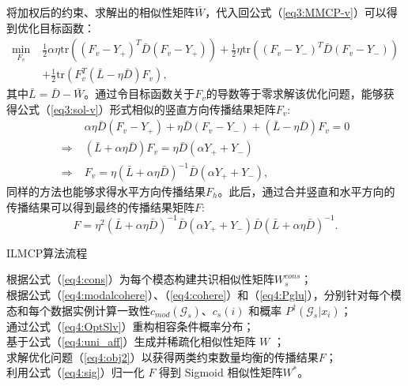 将加权后的约束、求解出的相似性矩阵$\bar{W}$，代入回公式（\ref{eq3:MMCP-v}）可以得到优化目标函数：
\begin{equation}
\begin{split}
\mathop{\mathrm{min}}_{{F}_v}\;&\frac{1}{2}\alpha\eta \mathrm{tr}(({F}_v-{Y}_+)^T{\bar{D}}({F}_v-{Y}_+))+\frac{1}{2}\eta \mathrm{tr}(({F}_v-{Y}_-)^T{\bar{D}}({F}_v-{Y}_-))\\
&+\frac{1}{2}\mathrm{tr}({F}_v^T(\bar{L}-\eta {\bar{D}}){F}_v), 
\end{split}
\label{eq4:obj2}
\end{equation}
其中$\bar{L} = \bar{D} - \bar{W}$。通过令目标函数关于$F_v$的导数等于零求解该优化问题，能够获得公式（\ref{eq3:sol-v}）形式相似的竖直方向传播结果矩阵$F_v$:
\begin{equation}
\begin{split}
        & \alpha\eta \bar{D} (F_v - Y_+) + \eta\bar{D} (F_v - Y_-)+(\bar{L}-\eta\bar{D})F_v = 0\\
\Rightarrow   \;          & (\bar{L}+\alpha\eta\bar{D})F_v = \eta\bar{D}(\alpha Y_++Y_-)\\
\Rightarrow   \;          & {F}_v = \eta(\bar{L}+\alpha\eta{\bar{D}})^{-1}{\bar{D}}(\alpha {Y}_++{Y}_-),
\end{split}
\end{equation}
同样的方法也能够求得水平方向传播结果$F_h$。此后，通过合并竖直和水平方向的传播结果可以得到最终的传播结果矩阵$F$:
\begin{equation}
{ F} = \eta^2(\bar{L}+\alpha\eta{\bar{D}})^{-1}{\bar{D}}(\alpha {Y}_++{Y}_-){\bar{D}}(\bar{L}+\alpha\eta{\bar{D}})^{-1}.
\end{equation}


\begin{algorithm}[tb]
    \caption{ILMCP算法流程}
    \label{alg4:ilmcp}
    根据公式（\ref{eq4:cons}）为每个模态构建共识相似性矩阵$ {W} ^{cons}_s$；\\
    根据公式（\ref{eq4:modalcohere}）、（\ref{eq4:cohere}）和（\ref{eq4:Pglu}），分别针对每个模态和每个数据实例计算一致性$ c_{mod}(\mathcal{G}_s)$、$c_s(i) $ 和概率 $ P^\dagger (\mathcal{G}_s|x_i) $；\\
    通过公式（\ref{eq4:OptSlv}）重构相容条件概率分布；\\
    基于公式（\ref{eq4:uni_aff}）生成并稀疏化相似性矩阵 $ {W} $ ；\\
    求解优化问题（\ref{eq4:obj2}）以获得两类约束数量均衡的传播结果$ {F} $；\\
    利用公式（\ref{eq4:sig}）归一化 $ {F} $ 得到 Sigmoid 相似性矩阵$ {W^*}$。
\end{algorithm}


